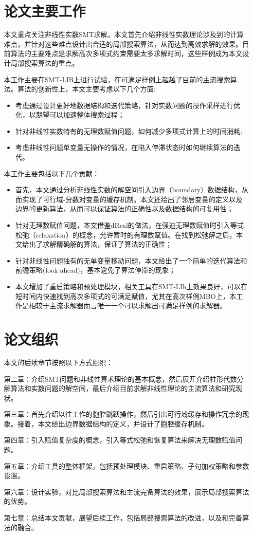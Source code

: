 \section{论文主要工作}
本文重点关注非线性实数SMT求解。本文首先介绍非线性实数理论涉及到的计算难点，并针对这些难点设计出合适的局部搜索算法，从而达到高效求解的效果。目前算法的主要难点是求解高次多项式约束需要太多求解时间，这些样例成为本文设计局部搜索算法的重点。

本工作主要在SMT-LIB\cite{BarFT-SMTLIB}上进行试验，在可满足样例上超越了目前的主流搜索算法。算法的创新性上，本文主要考虑以下几个方面:
\begin{itemize}
    \item 考虑通过设计更好地数据结构和迭代策略，针对实数问题的操作采样进行优化，以期望可以加速整体搜索过程；
    \item 针对非线性实数特有的无理数赋值问题，如何减少多项式计算上的时间消耗;
    \item 考虑非线性问题单变量无操作的情况，在陷入停滞状态时如何继续算法的迭代。
\end{itemize}

本工作主要包括以下几个贡献：
\begin{itemize}
    \item 首先，本文通过分析非线性实数的解空间引入边界（boundary）数据结构，从而实现了可行域-分数对变量的缓存机制。本文还给出了邻居变量的定义以及边界的更新算法，从而可以保证算法的正确性以及数据结构的可复用性；
    \item 针对无理数赋值问题，本文借鉴dReal的做法，在强迫无理数赋值时引入等式松弛（relaxation）的概念，允许暂时的有理数赋值。在找到松弛解之后，本文给出了求解精确解的算法，保证了算法的正确性；
    \item 针对非线性问题独有的无单变量移动问题，本文给出了一个简单的迭代算法和前瞻策略(look-ahead)，基本避免了算法停滞的现象；
    \item 本文增加了重启策略和预处理模块，相关工具在SMT-LIb上效果良好，可以在短时间内快速找到高次多项式的可满足赋值，尤其在高次样例MBO上，本工作是相较于主流求解器而言唯一一个可以求解出可满足样例的求解器。
\end{itemize}

\section{论文组织}
本文的后续章节按照以下方式组织：

第二章：介绍SMT问题和非线性算术理论的基本概念，然后展开介绍柱形代数分解算法和实数问题的解空间，最后介绍目前求解非线性理论的主流算法和研究现状。

第三章：首先介绍以往工作的胞腔跳跃操作，然后引出可行域缓存和操作冗余的现象。接着，本文给出边界数据结构的定义，并设计了胞腔缓存机制。

第四章：引入赋值复杂度的概念，引入等式松弛和恢复算法来解决无理数赋值问题。

第五章：介绍工具的整体框架，包括预处理模块、重启策略、子句加权策略和参数设置。

第六章：设计实验，对比局部搜索算法和主流完备算法的效果，展示局部搜索算法的优势。

第七章：总结本文贡献，展望后续工作，包括局部搜索算法的改进，以及和完备算法的融合。